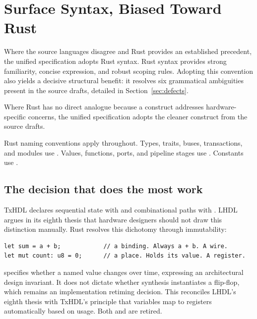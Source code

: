\section{Surface Syntax, Biased Toward Rust}
\label{sec:syntax}

Where the source languages disagree and Rust provides an established precedent,
the unified specification adopts Rust syntax. Rust syntax provides strong
familiarity, concise expression, and robust scoping rules. Adopting this
convention also yields a decisive structural benefit: it resolves six
grammatical ambiguities present in the source drafts, detailed in
Section~\ref{sec:defects}.

Where Rust has no direct analogue because a construct addresses hardware-specific
concerns, the unified specification adopts the cleaner construct from the source drafts.

Rust naming conventions apply throughout. Types, traits, buses, transactions,
and modules use . Values, functions, ports, and pipeline stages
use . Constants use .

\subsection{The decision that does the most work}

TxHDL declares sequential state with  and combinational paths with
. LHDL argues in its eighth thesis that hardware designers should not
draw this distinction manually. Rust resolves this dichotomy through immutability:

\begin{lstlisting}[caption={A binding and a place. \code{mut} encapsulates the distinction previously drawn between \code{wire} and \code{var}.},label={lst:mut}]
let sum = a + b;            // a binding. Always a + b. A wire.
let mut count: u8 = 0;      // a place. Holds its value. A register.
\end{lstlisting}

 specifies whether a named value changes over time, expressing an
architectural design invariant. It does not dictate whether synthesis instantiates
a flip-flop, which remains an implementation retiming decision. This reconciles
LHDL's eighth thesis with TxHDL's principle that variables map to registers
automatically based on usage. Both  and  are retired.

